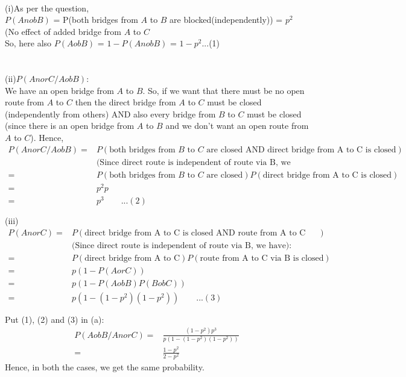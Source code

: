 \documentclass[12pt]{article}
\begin{document}
\begin{solution}
\begin{align*}
        \end{align*}
        (i)As per the question,\\ $P(AnobB)$ = P(both bridges from $A$ to $B$ are blocked(independently)) = $p^2$ (No effect of added bridge from $A$ to $C$\\
        So, here also $P(AobB)$ = $1-P(AnobB)$ =  $1-p^2$\quad\quad...(1)\\\\\\
        (ii)$P(AnorC/AobB)$:\\ We have an open bridge from $A$ to $B$. So, if we want that there must be no open route from $A$ to $C$ then the direct bridge from $A$ to $C$ must be closed (independently from others) AND also every bridge from $B$ to $C$ must be closed (since there is an open bridge from $A $ to $B$ and we don't want an open route from $A$ to $C$). Hence,
        \begin{align*}
            P(AnorC/AobB) = &P (\text{both bridges from $B$ to $C$ are closed AND direct bridge from A to C is closed} )\\&\text{(Since direct route is independent of route via B, we have):}\\ = &P(\text{both bridges from $B$ to $C$ are closed})P(\text{direct bridge from A to C is closed})\\= &p^2p \\=& p^3\quad\quad...(2)\\\\
        \end{align*}
        (iii) \begin{align*}
        P(AnorC) = &P(\text{direct bridge from A to C is closed AND route from A to C via B is closed})\\&\text{(Since direct route is independent of route via B, we have):} \\=& P(\text{direct bridge from A to C})P(\text{route from A to C via B is closed})\\=&p(1 - P(AorC))\\ = &p(1 - P(AobB)P(BobC))\\=& p(1-(1-p^2)(1-p^2))\quad\quad...(3)\\\\
        \end{align*}
        Put (1), (2) and (3) in (a):
        \begin{align*}
            P(AobB/AnorC) = &\frac{(1-p^2)p^3}{p(1-(1-p^2)(1-p^2))}\\
            = & \frac{1-p^2}{2-p^2}
        \end{align*}
        Hence, in both the cases, we get the same probability.
    \end{solution}
\end{document}
